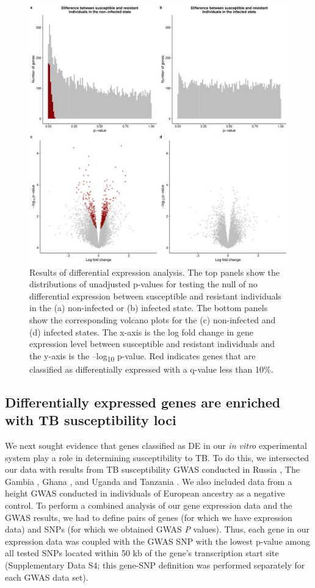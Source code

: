 \documentclass[fleqn,10pt]{wlscirep}
\begin{document}
\begin{figure}[p]
\centering
\includegraphics[width=\linewidth]{../figure/limma.pdf}
\caption{
Results of differential expression analysis. The top panels show the
distributions of unadjusted p-values for testing the null of no
differential expression between susceptible and resistant individuals
in the (a) non-infected or (b) infected state. The bottom panels show
the corresponding volcano plots for the (c) non-infected and (d)
infected states. The x-axis is the log fold change in gene expression
level between susceptible and resistant individuals and the y-axis is
the –log\textsubscript{10} p-value. Red indicates genes that are
classified as differentially expressed with a q-value less than 10\%.
}
\label{fig:limma}
\end{figure}
\subsection*{Differentially expressed genes are enriched with TB susceptibility loci}

We next sought evidence that genes classified as DE in our \emph{in
vitro} experimental system play a role in determining susceptibility
to TB. To do this, we intersected our data with results from TB
susceptibility GWAS conducted in Russia \cite{Curtis2015}, The Gambia
\cite{Thye2010}, Ghana \cite{Thye2010}, and Uganda and Tanzania
\cite{Sobota2016}. We also included data from a height GWAS conducted
in individuals of European ancestry \cite{LangoAllen2010} as a
negative control. To perform a combined analysis of our gene
expression data and the GWAS results, we had to define pairs of genes
(for which we have expression data) and SNPs (for which we obtained
GWAS \emph{P} values). Thus, each gene in our expression data was
coupled with the GWAS SNP with the lowest p-value among all tested
SNPs located within 50 kb of the gene’s transcription start site
(Supplementary Data S4; this gene-SNP definition was performed
separately for each GWAS data set).
\end{document}

